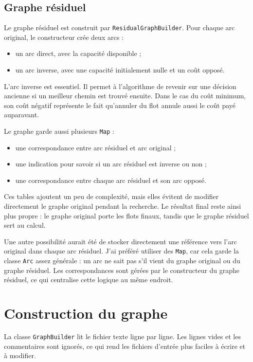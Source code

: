 \documentclass[11pt,a4paper]{article}
\begin{document}
\subsection{Graphe résiduel}

Le graphe résiduel est construit par \texttt{ResidualGraphBuilder}. Pour chaque
arc original, le constructeur crée deux arcs :
\begin{itemize}
    \item un arc direct, avec la capacité disponible ;
    \item un arc inverse, avec une capacité initialement nulle et un coût opposé.
\end{itemize}

L'arc inverse est essentiel. Il permet à l'algorithme de revenir sur une décision
ancienne si un meilleur chemin est trouvé ensuite. Dans le cas du coût minimum,
son coût négatif représente le fait qu'annuler du flot annule aussi le coût
payé auparavant.

Le graphe garde aussi plusieurs \texttt{Map} :
\begin{itemize}
    \item une correspondance entre arc résiduel et arc original ;
    \item une indication pour savoir si un arc résiduel est inverse ou non ;
    \item une correspondance entre chaque arc résiduel et son arc opposé.
\end{itemize}

Ces tables ajoutent un peu de complexité, mais elles évitent de modifier
directement le graphe original pendant la recherche. Le résultat final reste
ainsi plus propre : le graphe original porte les flots finaux, tandis que le
graphe résiduel sert au calcul.

Une autre possibilité aurait été de stocker directement une référence vers l'arc
original dans chaque arc résiduel. J'ai préféré utiliser des \texttt{Map}, car
cela garde la classe \texttt{Arc} assez générale : un arc ne sait pas s'il vient
du graphe original ou du graphe résiduel. Les correspondances sont gérées par le
constructeur du graphe résiduel, ce qui centralise cette logique au même endroit.

\section{Construction du graphe}

La classe \texttt{GraphBuilder} lit le fichier texte ligne par ligne. Les lignes
vides et les commentaires sont ignorés, ce qui rend les fichiers d'entrée plus
faciles à écrire et à modifier.
\end{document}
